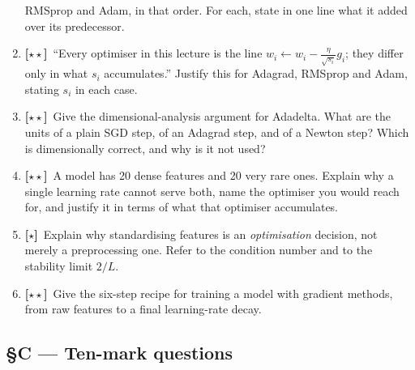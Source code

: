 \documentclass[11pt,a4paper]{article}
\newcommand{\LB}{{\footnotesize\textbf{[$\star\star$]}}}
\newcommand{\LC}{{\footnotesize\textbf{[$\star$]}}}
\newcommand{\Q}[1]{\item[\textbf{#1}]}
\begin{document}
\begin{enumerate}[leftmargin=2.2cm]
  RMSprop and Adam, in that order. For each, state in one line what it added
  over its predecessor.
\Q{U3.40}\LB\ ``Every optimiser in this lecture is the line
  $w_i \leftarrow w_i - \frac{\eta}{\sqrt{s_i}}g_i$; they differ only in what
  $s_i$ accumulates.'' Justify this for Adagrad, RMSprop and Adam, stating
  $s_i$ in each case.
\Q{U3.41}\LB\ Give the dimensional-analysis argument for Adadelta. What are the
  units of a plain SGD step, of an Adagrad step, and of a Newton step? Which is
  dimensionally correct, and why is it not used?
\Q{U3.42}\LB\ A model has 20 dense features and 20 very rare ones. Explain why
  a single learning rate cannot serve both, name the optimiser you would reach
  for, and justify it in terms of what that optimiser accumulates.
\Q{U3.43}\LC\ Explain why standardising features is an \emph{optimisation}
  decision, not merely a preprocessing one. Refer to the condition number and
  to the stability limit $2/L$.
\Q{U3.44}\LB\ Give the six-step recipe for training a model with gradient
  methods, from raw features to a final learning-rate decay.
\end{enumerate}

\subsection*{§C --- Ten-mark questions}
\end{document}
